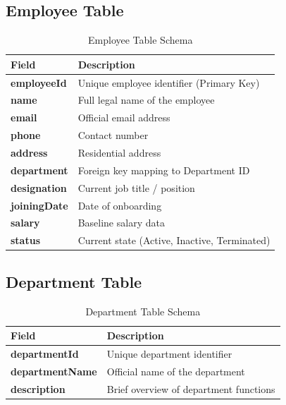 \documentclass[12pt,a4paper]{report}
\begin{document}
\subsection{Employee Table}
\begin{table}[h!]
\centering
{}
\begin{tabularx}{\textwidth}{>{\bfseries}lX}
\toprule
\rowcolor{lightblue}
\textbf{Field} & \textbf{Description} \\
\midrule
employeeId   & Unique employee identifier (Primary Key) \\
name         & Full legal name of the employee \\
email        & Official email address \\
phone        & Contact number \\
address      & Residential address \\
department   & Foreign key mapping to Department ID \\
designation  & Current job title / position \\
joiningDate  & Date of onboarding \\
salary       & Baseline salary data \\
status       & Current state (Active, Inactive, Terminated) \\
\bottomrule
\end{tabularx}
\caption{Employee Table Schema}
\end{table}

\subsection{Department Table}
\begin{table}[h!]
\centering
{}
\begin{tabularx}{\textwidth}{>{\bfseries}lX}
\toprule
\rowcolor{lightblue}
\textbf{Field} & \textbf{Description} \\
\midrule
departmentId   & Unique department identifier \\
departmentName & Official name of the department \\
description    & Brief overview of department functions \\
\bottomrule
\end{tabularx}
\caption{Department Table Schema}
\end{table}
\end{document}
